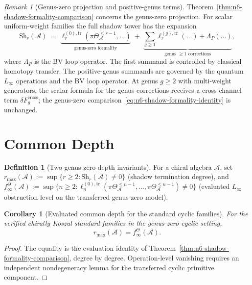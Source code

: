 \documentclass[11pt,reqno]{amsart}
\newtheorem{corollary}[theorem]{Corollary}
\theoremstyle{definition}
\newtheorem{definition}[theorem]{Definition}
\theoremstyle{remark}
\newtheorem{remark}[theorem]{Remark}
\providecommand{\cA}{\mathcal{A}}
\providecommand{\Sh}{\mathrm{Sh}}
\providecommand{\Linf}{L_\infty}
\numberwithin{equation}{section}
\begin{document}
\begin{remark}[Genus-zero projection and positive-genus terms]
Theorem~\ref{thm:n6-shadow-formality-comparison} concerns the
genus-zero projection. For scalar uniform-weight families the full
shadow tower has the expansion
\[
\Sh_r(\cA)\;=\;\underbrace{\ell_r^{(0),\mathrm{tr}}
(\pi\Theta^{\le r-1}_{\cA},\dots)}_{\text{genus-zero formality}}
\;+\;\underbrace{\sum_{g\ge 1}\ell_r^{(g),\mathrm{tr}}(\dots)
+\Lambda_P(\dots)}_{\text{genus }\ge 1\text{ corrections}},
\]
where $\Lambda_P$ is the BV loop operator. The first summand is
controlled by classical homotopy transfer. The positive-genus
summands are governed by the quantum $\Linf$ operations and the BV
loop operator. At genus $g\ge 2$ with multi-weight
generators, the scalar formula for the genus corrections
receives a cross-channel term $\delta F_g^{\mathrm{cross}}$;
the genus-zero comparison~\eqref{eq:n6-shadow-formality-identity}
is unchanged.
\end{remark}

\section{Common Depth}\label{sec:n6-common-depth}

\begin{definition}[Two genus-zero depth invariants]
For a chiral algebra $\cA$, set
$r_{\max}(\cA):=\sup\{r\ge 2:\Sh_r(\cA)\ne 0\}$ (shadow
termination degree), and
$f_\infty^\Theta(\cA):=\sup\{n\ge 2:
\ell_n^{(0),\mathrm{tr}}(\pi\Theta^{\le n-1}_{\cA},\ldots,
\pi\Theta^{\le n-1}_{\cA})\ne 0\}$
(evaluated $\Linf$ obstruction level on the transferred genus-zero
model).
\end{definition}

\begin{corollary}[Evaluated common depth for the standard cyclic families]
\label{cor:n6-evaluated-depth}
For the verified chirally Koszul standard families in the
genus-zero cyclic setting,
\[
r_{\max}(\cA)=f_\infty^\Theta(\cA).
\]
\end{corollary}

\begin{proof}
The equality is the evaluation identity of
Theorem~\ref{thm:n6-shadow-formality-comparison}, degree by
degree. Operation-level vanishing requires an independent
nondegeneracy lemma for the transferred cyclic primitive component.
\end{proof}
\end{document}
